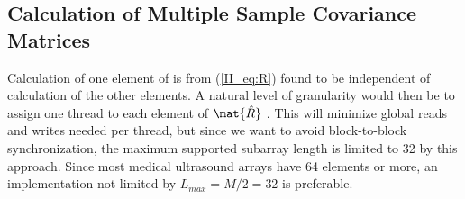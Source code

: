 

\subsection{Calculation of Multiple Sample Covariance Matrices}\label{II_sec:calcR}


Calculation of one element of \R is from (\ref{II_eq:R}) found to be independent of calculation of the other elements. A natural level of granularity would then be to assign one thread to each element of $\mat{\hat{R}}$ \cite{Chen2011}. This will minimize global reads and writes needed per thread, but since we want to avoid block-to-block synchronization, the maximum supported subarray length is limited to 32 by this approach. Since most medical ultrasound arrays have 64 elements or more, an implementation not limited by $L_{max}=M/2=32$ is preferable.

